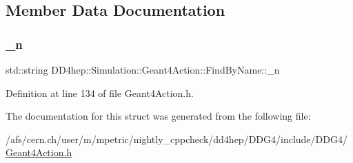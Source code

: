 \subsection{Member Data Documentation}
\hypertarget{struct_d_d4hep_1_1_simulation_1_1_geant4_action_1_1_find_by_name_ab2021d91a8c4487ef27bce6cb6d69966}{}\label{struct_d_d4hep_1_1_simulation_1_1_geant4_action_1_1_find_by_name_ab2021d91a8c4487ef27bce6cb6d69966} 
\subsubsection{\texorpdfstring{\+\_\+n}{\_n}}
{\footnotesize\ttfamily std\+::string D\+D4hep\+::\+Simulation\+::\+Geant4\+Action\+::\+Find\+By\+Name\+::\+\_\+n}



Definition at line 134 of file Geant4\+Action.\+h.



The documentation for this struct was generated from the following file\+:\begin{DoxyCompactItemize}
\item 
/afs/cern.\+ch/user/m/mpetric/nightly\+\_\+cppcheck/dd4hep/\+D\+D\+G4/include/\+D\+D\+G4/\hyperlink{_geant4_action_8h}{Geant4\+Action.\+h}\end{DoxyCompactItemize}
